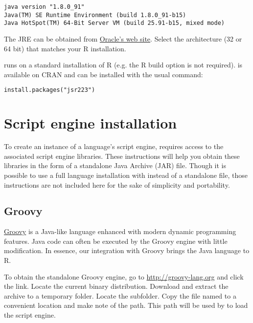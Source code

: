 \begin{verbatim}
java version "1.8.0_91"
Java(TM) SE Runtime Environment (build 1.8.0_91-b15)
Java HotSpot(TM) 64-Bit Server VM (build 25.91-b15, mixed mode)
\end{verbatim}

The JRE can be obtained from  \href{http://www.oracle.com/technetwork/java/javase/downloads/jre8-downloads-2133155.html}{Oracle's web site}. Select the architecture (32 or 64 bit) that matches your R installation.

 runs on a standard installation of R (e.g. the R build option  is not required).  is available on CRAN and can be installed with the usual command:

\begin{verbatim}
install.packages("jsr223")
\end{verbatim}

\hypertarget{scriptengineinstallation}{\section{Script engine installation}}

To create an instance of a language's script engine,  requires access to the associated script engine libraries. These instructions will help you obtain these libraries in the form of a standalone Java Archive (JAR) file. Though it is possible to use a full language installation with  instead of a standalone file, those instructions are not included here for the sake of simplicity and portability.

\subsection{Groovy}

\href{http://groovy-lang.org}{Groovy} is a Java-like language enhanced with modern dynamic programming features. Java code can often be executed by the Groovy engine with little modification. In essence, our integration with Groovy brings the Java language to R.

To obtain the standalone Groovy engine, go to \url{http://groovy-lang.org} and click the  link. Locate the current binary distribution. Download and extract the archive to a temporary folder. Locate the  subfolder. Copy the file named  to a convenient location and make note of the path. This path will be used by  to load the script engine.

